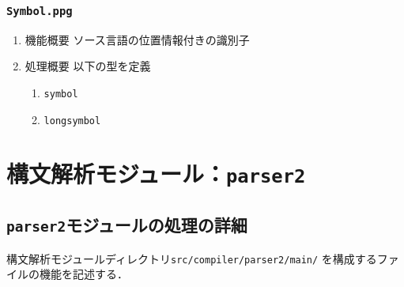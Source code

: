 \documentclass{jbook}
\newif\ifjp
\newcommand{\txt}[2]{#1}
\newcommand{\code}[1]{\mbox{\large\tt #1}}
\begin{document}
\subsection{\code{Symbol.ppg}}
\begin{enumerate}
\item 機能概要 ソース言語の位置情報付きの識別子
\item 処理概要 
以下の型を定義
\begin{enumerate}
\item \code{symbol}
\item \code{longsymbol}
\end{enumerate}
\end{enumerate}
\else%
\fi%


% 
\chapter{\txt
{構文解析モジュール：\code{parser2}}
{Parsing module : \code{parser2}}
}
\label{chap:parsing}
\ifjp%
\begin{enumerate}
\item ソースロケーション \code{src/compiler/parser2/main}以下のファイル
\item 機能概要
	構文解析処理
\item 処理概要
以下のデータと処理を定義
\begin{enumerate}
\item ソース言語の構文解析のための文法と語彙の定義
\item インターフェイス言語の構文解析のための文法の定義
\item ソース言語のパーザの定義
\item インタフェイス言語のパーザの定義
\end{enumerate}
\end{enumerate}
\else%
\fi%


\section{\txt{\code{parser2}モジュールの処理の詳細}{The details of \code{parser2} module}}
\ifjp%
	構文解析モジュールディレクトリ\code{src/compiler/parser2/main/}
を構成するファイルの機能を記述する．
\end{document}
